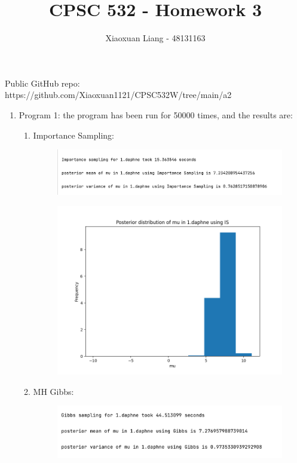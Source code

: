 \documentclass{article}
\title{ \normalfont \normalsize 
\huge CPSC 532 - Homework 3}
\date{}
\author{Xiaoxuan Liang - 48131163}
\begin{document}
\maketitle

Public GitHub repo: https://github.com/Xiaoxuan1121/CPSC532W/tree/main/a2
\begin{enumerate}
\item Program 1: the program has been run for 50000 times,  and the results are:
\begin{enumerate}
\item Importance Sampling:

\begin{figure}[!ht]
	\centering
	\includegraphics[scale=0.6]{../figs/IS/1_program_results}
\end{figure}

\begin{figure}[!ht]
	\centering
	\includegraphics[scale=0.6]{../figs/IS/posterior_histogram_1_daphne}
\end{figure}

\newpage
\item MH Gibbs:

\begin{figure}[!ht]
	\centering
	\includegraphics[scale=0.6]{../figs/Gibbs/1_program_results}
\end{figure}


\end{enumerate}
\end{enumerate}
\end{document}
